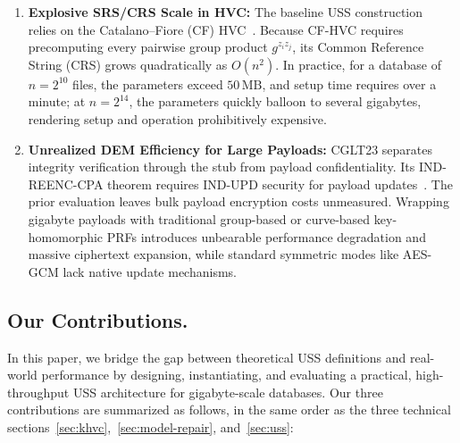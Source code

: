 \begin{enumerate}
    \item \textbf{Explosive SRS/CRS Scale in HVC:} The baseline USS construction~\cite{CGLT23} relies on the Catalano--Fiore (CF) HVC~\cite{CF13}. Because CF-HVC requires precomputing every pairwise group product $g^{z_i z_j}$, its Common Reference String (CRS) grows quadratically as $O(n^2)$. In practice, for a database of $n = 2^{10}$ files, the parameters exceed $50\,\text{MB}$, and setup time requires over a minute; at $n = 2^{14}$, the parameters quickly balloon to several gigabytes, rendering setup and operation prohibitively expensive.
    \item \textbf{Unrealized DEM Efficiency for Large Payloads:} CGLT23 separates integrity verification through the stub from payload confidentiality. Its IND-REENC-CPA theorem requires IND-UPD security for payload updates~\cite[Thm.~5]{CGLT23}. The prior evaluation leaves bulk payload encryption costs unmeasured. Wrapping gigabyte payloads with traditional group-based or curve-based key-homomorphic PRFs introduces unbearable performance degradation and massive ciphertext expansion, while standard symmetric modes like AES-GCM lack native update mechanisms.
\end{enumerate}

\subsection{Our Contributions.}
In this paper, we bridge the gap between theoretical USS definitions and real-world performance by designing, instantiating, and evaluating a practical, high-throughput USS architecture for gigabyte-scale databases. Our three contributions are summarized as follows, in the same order as the three technical sections~\ref{sec:khvc},~\ref{sec:model-repair}, and~\ref{sec:uss}:

